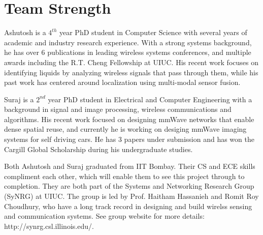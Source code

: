 
\vspace{-4mm}
\section{Team Strength}
\vspace{-2mm}

Ashutosh is a $4^{th}$ year PhD student in Computer Science with several years of academic and industry research experience. With a strong systems background, he has over 6 publications in leading wireless systems conferences, and multiple awards including the R.T. Cheng Fellowship at UIUC. His recent work focuses on identifying liquids by analyzing wireless signals that pass through them, while his past work has centered around localization using multi-modal sensor fusion.


Suraj is a $2^{nd}$ year PhD student in Electrical and Computer Engineering with a background
in  signal and image processing, wireless communications and algorithms. His recent
work focused on designing mmWave networks that enable dense spatial reuse, and currently he is working on desiging mmWave imaging systems for self driving cars. He has 3 papers under submission and has won the
Cargill Global Scholarship during his undergraduate studies. 


Both Ashutosh and Suraj graduated from IIT Bombay. Their CS and ECE skills compliment each other, which will enable them to see this project through to completion. They are both part of the Systems and Networking Research Group (SyNRG) at UIUC. The group is led by 
Prof. Haitham Hassanieh and Romit Roy Choudhury, who have a long track record
in designing and build wirelss sensing and communication systems. See group website
for more details: http://synrg.csl.illinois.edu/.
